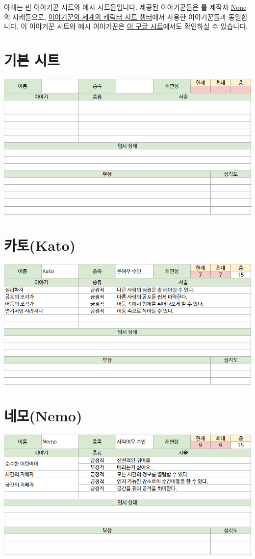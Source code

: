 \documentclass{report}
\begin{document}
	아래는 빈 이야기꾼 시트와 예시 시트들입니다. 제공된 이야기꾼들은 룰 제작자 \href{https://www.twitter.com/n0n3x1573n7_WS}{None}의 자캐들으로, \hyperlink{sheets}{이야기꾼의 세계의 캐릭터 시트 챕터}에서 사용한 이야기꾼들과 동일합니다. 이 이야기꾼 시트와 예시 이야기꾼은 \href{https://docs.google.com/spreadsheets/d/14xSfMVRGJlXmEfHmg3_xD5Mbd9HLniCgCktDBgF5O44/edit?usp=sharing}{이 구글 시트}에서도 확인하실 수 있습니다.
	
	\section*{기본 시트}
		\includegraphics[width=\textwidth]{./Chapters/Lite/sheets/base.png}
	
	\section*{카토(Kato)}
		\includegraphics[width=\textwidth]{./Chapters/Lite/sheets/kato.png}
	
	\section*{네모(Nemo)}
		\includegraphics[width=\textwidth]{./Chapters/Lite/sheets/nemo.png}
	
\end{document}
